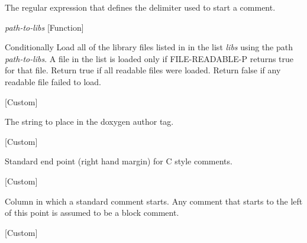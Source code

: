 \begin{doc-string}
The regular expression that defines the delimiter used to start
a comment.
\end{doc-string}

\vspace{1em}
\noindent
{}
\usebox{\funcname}\emph{path-to-libs}
 \hfill [Function]
\hspace*{\wd\funcname}

\begin{doc-string}
Conditionally Load all of the library files listed in in the list \emph{libs} using
the path \emph{path-to-libs}.  A file in the list is loaded only if FILE-READABLE-P
returns true for that file.  Return true if all readable files were loaded.
Return false if any readable file failed to load.
\end{doc-string}

\vspace{1em}
\noindent
{}
\usebox{\funcname}
 \hfill [Custom]

\begin{doc-string}
The string to place in the doxygen author tag.
\end{doc-string}

\vspace{1em}
\noindent
{}
\usebox{\funcname}
 \hfill [Custom]

\begin{doc-string}
Standard end point (right hand margin) for C style comments.
\end{doc-string}

\vspace{1em}
\noindent
{}
\usebox{\funcname}
 \hfill [Custom]

\begin{doc-string}
Column in which a standard comment starts.  Any comment that starts to the left of
this point is assumed to be a block comment.
\end{doc-string}

\vspace{1em}
\noindent
{}
\usebox{\funcname}
 \hfill [Custom]

